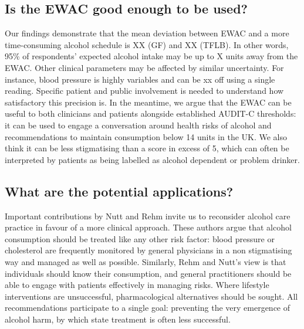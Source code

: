 \documentclass[]{article}
\begin{document}
\hypertarget{is-the-ewac-good-enough-to-be-used}{%
\subsection{Is the EWAC good enough to be
used?}\label{is-the-ewac-good-enough-to-be-used}}

Our findings demonstrate that the mean deviation between EWAC and a more
time-consuming alcohol schedule is XX (GF) and XX (TFLB). In other
words, 95\% of respondents' expected alcohol intake may be up to X units
away from the EWAC. Other clinical parameters may be affected by similar
uncertainty. For instance, blood pressure is highly variables and can be
xx off using a single reading. Specific patient and public involvement
is needed to understand how satisfactory this precision is. In the
meantime, we argue that the EWAC can be useful to both clinicians and
patients alongside established AUDIT-C thresholds: it can be used to
engage a conversation around health risks of alcohol and recommendations
to maintain consumption below 14 units in the UK. We also think it can
be less stigmatising than a score in excess of 5, which can often be
interpreted by patients as being labelled as alcohol dependent or
problem drinker.

\hypertarget{what-are-the-potential-applications}{%
\subsection{What are the potential
applications?}\label{what-are-the-potential-applications}}

Important contributions by Nutt and Rehm invite us to reconsider alcohol
care practice in favour of a more clinical approach. These authors argue
that alcohol consumption should be treated like any other risk factor:
blood pressure or cholesterol are frequently monitored by general
physicians in a non stigmatising way and managed as well as possible.
Similarly, Rehm and Nutt's view is that individuals should know their
consumption, and general practitioners should be able to engage with
patients effectively in managing risks. Where lifestyle interventions
are unsuccessful, pharmacological alternatives should be sought. All
recommendations participate to a single goal: preventing the very
emergence of alcohol harm, by which state treatment is often less
successful.
\end{document}
